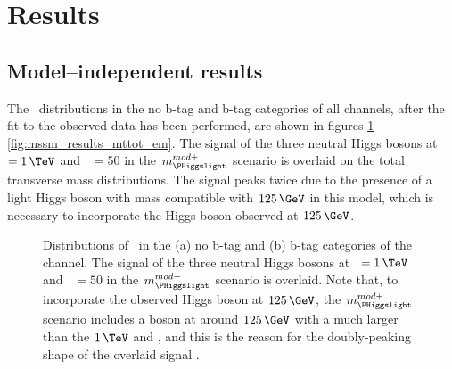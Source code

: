 \section{Results}
\label{sec:mssm_results}
\subsection{Model--independent results}
\label{sec:mssm_results_modelindep}
The \mTtot~distributions in the no b-tag and b-tag
categories of all channels, after the fit to the observed
data has been performed, are shown in figures \ref{fig:mssm_results_mttot_mt}--\ref{fig:mssm_results_mttot_em}.
The signal of the three neutral Higgs bosons at \mA~$=1\,\TeV$ and \tanb~$=50$ in the $m_{\PHiggslight}^{mod+}$ scenario is overlaid 
on the total transverse mass distributions. The signal peaks twice due to the presence of a light Higgs boson
with mass compatible with $125\,\GeV$ in this model, which is necessary to incorporate the Higgs boson
observed at $125\,\GeV$.

\begin{figure}[h!]
\begin{center}
\end{center}
\caption[Distributions of \mTtot~in the no b-tag and b-tag categories
of the \mutau channel.]{Distributions of \mTtot~in the (a) no b-tag and (b) b-tag categories 
of the \mutau channel. The signal of the three neutral Higgs bosons at \mA~$=1\,\TeV$ 
and \tanb~$=50$ in the $m_{\PHiggslight}^{mod+}$ scenario is overlaid. Note that, to incorporate
the observed Higgs boson at $125\,\GeV$, the $m_{\PHiggslight}^{mod+}$ scenario includes a \PHiggslight boson
at around $125\,\GeV$ with a much larger \xsbr than the $1\,\TeV$ \PHiggs and \PHiggsps, and this is
the reason for the doubly-peaking shape of the overlaid signal \cite{CMS-PAS-HIG-16-037}.}
\label{fig:mssm_results_mttot_mt}
\end{figure}

